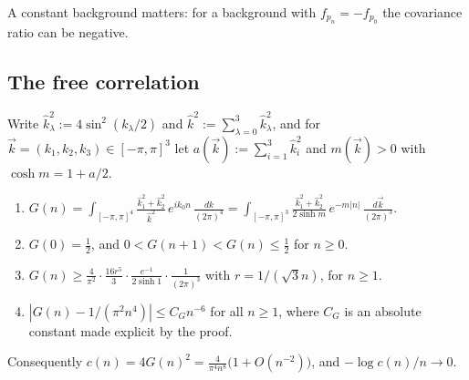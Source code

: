 A constant background matters: for a background with $f_{p_n}=-f_{p_0}$ the covariance ratio can be negative.

\subsection{The free correlation}\label{pf:sec-G}

Write $\hat k_\lambda^2:=4\sin^2(k_\lambda/2)$ and $\hat k^2:=\sum_{\lambda=0}^3\hat k_\lambda^2$, and for $\vec k=(k_1,k_2,k_3)\in[-\pi,\pi]^3$ let $a(\vec k):=\sum_{i=1}^3\hat k_i^2$ and $m(\vec k)>0$ with $\cosh m=1+a/2$.

\begin{lemma}\label{pf:lem-G}
\leavevmode
\begin{enumerate}
\item $G(n)=\displaystyle\int_{[-\pi,\pi]^4}\frac{\hat k_1^2+\hat k_2^2}{\hat k^2}\,e^{ik_0n}\,\frac{dk}{(2\pi)^4}=\int_{[-\pi,\pi]^3}\frac{\hat k_1^2+\hat k_2^2}{2\sinh m}\,e^{-m|n|}\,\frac{d\vec k}{(2\pi)^3}$.
\item $G(0)=\tfrac12$, and $0<G(n+1)<G(n)\le\tfrac12$ for $n\ge0$.
\item $G(n)\ge\frac4{\pi^2}\cdot\frac{16r^5}3\cdot\frac{e^{-1}}{2\sinh1}\cdot\frac1{(2\pi)^3}$ with $r=1/(\sqrt3n)$, for $n\ge1$.
\item $|G(n)-1/(\pi^2n^4)|\le C_Gn^{-6}$ for all $n\ge1$, where $C_G$ is an absolute constant made explicit by the proof.
\end{enumerate}
Consequently $c(n)=4G(n)^2=\frac4{\pi^4n^8}\big(1+O(n^{-2})\big)$, and $-\log c(n)/n\to0$.
\end{lemma}

